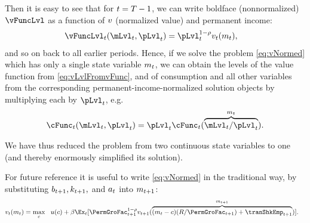 \documentclass[SolvingMicroDSOPs]{subfiles}
\begin{document}
Then it is easy to see that for $t=T-1$, we can write boldface (nonnormalized) $\vFuncLvl$ as a function of $v$ (normalized value) and permanent income:
\begin{equation}\begin{gathered}\begin{aligned}
      \vFuncLvl_{\prd}(\mLvl_{\prd},\pLvl_{\prd}) & =  \pLvl_{\prd}^{1-\CRRA}\vFunc_{\prdt}(\mNrm_{\prdt}), \label{eq:vLvlFromvFunc}
    \end{aligned}\end{gathered}\end{equation}
and so on back to all earlier periods.  Hence, if we solve the problem \eqref{eq:vNormed} which has only a single state variable $m_{t}$, we can obtain the levels of the value function from \eqref{eq:vLvlFromvFunc}, and of consumption and all other variables from the corresponding permanent-income-normalized solution objects by multiplying each by $\pLvl_{\prd}$, e.g.\
\begin{equation*}\begin{gathered}\begin{aligned}
  \cFunc_{\prd}(\mLvl_{\prd},\pLvl_{\prd})=\pLvl_{\prd}\cFunc_{\prd}(\overbrace{\mLvl_{\prd}/\pLvl_{\prd}}^{\mNrm_{\prd}}).
    \end{aligned}\end{gathered}\end{equation*}

We have thus reduced the problem from two continuous state variables to one (and thereby enormously simplified its solution).

For future reference it is useful to write \eqref{eq:vNormed} in the traditional way, by substituting $b_{t+1},k_{t+1},$ and $a_{t}$ into $m_{t+1}$:
\begin{equation}\begin{gathered}\begin{aligned}
      \vFunc_{\prdt}(\mNrm_{\prdt}) & = \max_{\cNrm} ~~ \uFunc(\cNrm)+ \DiscFac \Ex_{\prdt}[ \PermGroFac_{\prdt+1}^{1-\CRRA}\vFunc_{\prdt+1}(\overbrace{(\mNrm_{t}-\cNrm)(\Rfree/\PermGroFac_{t+1})+\tranShkEmp_{t+1}}^{m_{t+1}})] \label{eq:vusual}.
    \end{aligned}\end{gathered}\end{equation}
\end{document}
